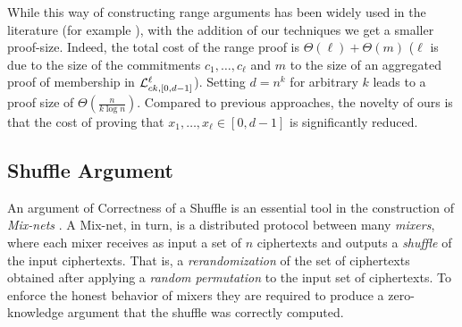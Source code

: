 While this way of constructing range arguments has been widely used in the literature (for example \cite{AC:CamChaShe08,PAIRING:RiaKohPre09}), with the addition of our techniques we get a smaller proof-size. Indeed, the total cost of the range proof is $\Theta(\ell)+\Theta(m)$ ($\ell$ is due to the size of the commitments $c_1,\ldots,c_\ell$ and $m$ to the size of an aggregated proof of membership in $\mathcal{L}_{ck,[0,d-1]}^\ell$).  Setting $d=n^{k}$ for arbitrary $k$ leads to a proof size of $\Theta(\frac{n}{k \log n})$. Compared to previous approaches, the novelty of ours is that the cost of proving that $x_1,\ldots,x_\ell\in[0,d-1]$ is significantly reduced.

\subsection{Shuffle Argument}
An argument of Correctness of a Shuffle is an essential tool in the construction of \emph{Mix-nets} \cite{CACM:Chaum81}. A Mix-net, in turn, is a distributed protocol between many \emph{mixers}, where each mixer receives as input a set of $n$ ciphertexts and  outputs a \emph{shuffle} of the input ciphertexts. That is, a \emph{rerandomization} of the set of ciphertexts obtained after applying a \emph{random permutation} to the input set of ciphertexts. To enforce the honest behavior of mixers they are required to produce a zero-knowledge argument that the shuffle was correctly computed.  

